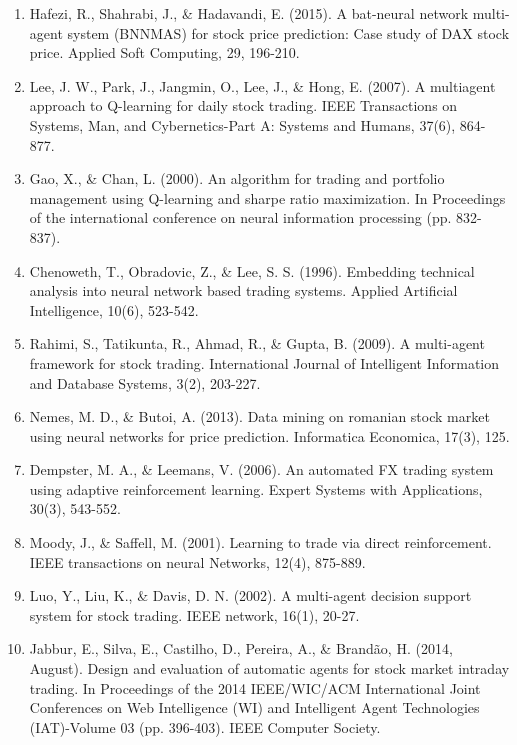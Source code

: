 \documentclass[prodmode,acmtecs]{acmsmall} %
\begin{document}
\begin{enumerate}

\item Hafezi, R., Shahrabi, J., \& Hadavandi, E. (2015). A bat-neural network multi-agent system (BNNMAS) for stock price prediction: Case study of DAX stock price. Applied Soft Computing, 29, 196-210.

\item Lee, J. W., Park, J., Jangmin, O., Lee, J., \& Hong, E. (2007). A multiagent approach to Q-learning for daily stock trading. IEEE Transactions on Systems, Man, and Cybernetics-Part A: Systems and Humans, 37(6), 864-877.

\item Gao, X., \& Chan, L. (2000). An algorithm for trading and portfolio management using Q-learning and sharpe ratio maximization. In Proceedings of the international conference on neural information processing (pp. 832-837).

\item Chenoweth, T., Obradovic, Z., \& Lee, S. S. (1996). Embedding technical analysis into neural network based trading systems. Applied Artificial Intelligence, 10(6), 523-542.

\item Rahimi, S., Tatikunta, R., Ahmad, R., \& Gupta, B. (2009). A multi-agent framework for stock trading. International Journal of Intelligent Information and Database Systems, 3(2), 203-227.

\item Nemes, M. D., \& Butoi, A. (2013). Data mining on romanian stock market using neural networks for price prediction. Informatica Economica, 17(3), 125.

\item Dempster, M. A., \& Leemans, V. (2006). An automated FX trading system using adaptive reinforcement learning. Expert Systems with Applications, 30(3), 543-552.

\item Moody, J., \& Saffell, M. (2001). Learning to trade via direct reinforcement. IEEE transactions on neural Networks, 12(4), 875-889.

\item Luo, Y., Liu, K., \& Davis, D. N. (2002). A multi-agent decision support system for stock trading. IEEE network, 16(1), 20-27.

\item Jabbur, E., Silva, E., Castilho, D., Pereira, A., \& Brandão, H. (2014, August). Design and evaluation of automatic agents for stock market intraday trading. In Proceedings of the 2014 IEEE/WIC/ACM International Joint Conferences on Web Intelligence (WI) and Intelligent Agent Technologies (IAT)-Volume 03 (pp. 396-403). IEEE Computer Society.


\end{enumerate}
\end{document}
